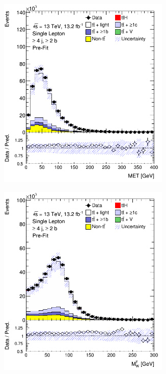 \begin{figure}[p]
\begin{subfigure}{0.33\textwidth}
  \caption{}
  \label{}
\end{subfigure}
\begin{subfigure}{0.33\textwidth}
  \centering
  \includegraphics[width=0.9\textwidth]{figures/ttH/presel/ljets_MET_ge4jge2b.png}
  \caption{}
  \label{}
\end{subfigure}
\begin{center}
\begin{subfigure}{0.33\textwidth}
  \centering
  \includegraphics[width=0.9\textwidth]{figures/ttH/presel/ljets_MTW_ge4jge2b.png}

\end{subfigure}
\end{center}
\end{figure}
